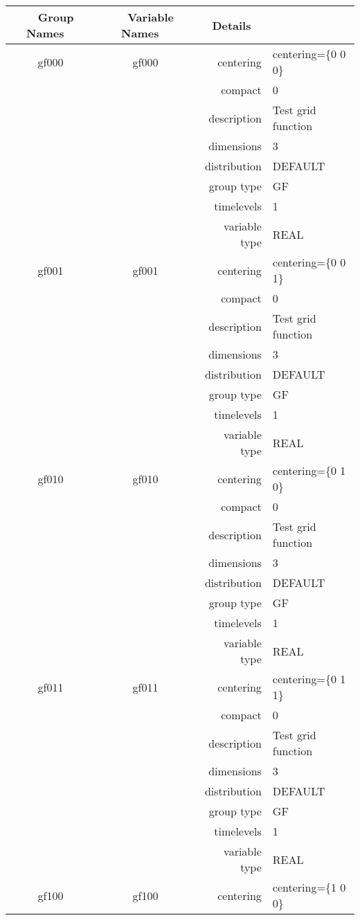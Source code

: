 \begin{tabular*}{150mm}{|c|c@{\extracolsep{\fill}}|rl|} \hline 
~ {\bf Group Names} ~ & ~ {\bf Variable Names} ~  &{\bf Details} ~ & ~\\ 
\hline 
gf000 & gf000 & centering & centering=\{0 0 0\} \\ 
 &  & compact & 0 \\ 
 &  & description & Test grid function \\ 
 &  & dimensions & 3 \\ 
 &  & distribution & DEFAULT \\ 
 &  & group type & GF \\ 
 &  & timelevels & 1 \\ 
 &  & variable type & REAL \\ 
\hline 
gf001 & gf001 & centering & centering=\{0 0 1\} \\ 
 &  & compact & 0 \\ 
 &  & description & Test grid function \\ 
 &  & dimensions & 3 \\ 
 &  & distribution & DEFAULT \\ 
 &  & group type & GF \\ 
 &  & timelevels & 1 \\ 
 &  & variable type & REAL \\ 
\hline 
gf010 & gf010 & centering & centering=\{0 1 0\} \\ 
 &  & compact & 0 \\ 
 &  & description & Test grid function \\ 
 &  & dimensions & 3 \\ 
 &  & distribution & DEFAULT \\ 
 &  & group type & GF \\ 
 &  & timelevels & 1 \\ 
 &  & variable type & REAL \\ 
\hline 
gf011 & gf011 & centering & centering=\{0 1 1\} \\ 
 &  & compact & 0 \\ 
 &  & description & Test grid function \\ 
 &  & dimensions & 3 \\ 
 &  & distribution & DEFAULT \\ 
 &  & group type & GF \\ 
 &  & timelevels & 1 \\ 
 &  & variable type & REAL \\ 
\hline 
gf100 & gf100 & centering & centering=\{1 0 0\} \\ 

\end{tabular*}
